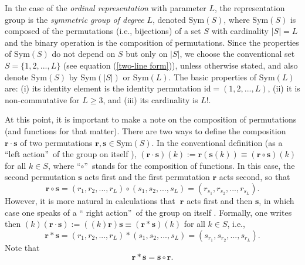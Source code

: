 \documentclass[%
 aip,
 amsmath,amssymb,
 reprint,%
]{revtex4-1}
\begin{document}
In the case of the \textit{ordinal representation} with parameter $L$, the
representation group is the \textit{symmetric group of degree} $L$, denoted $%
\mathrm{Sym}(S)$, where $\mathrm{Sym}(S)$ is composed of the permutations
(i.e., bijections) of a set $S$ with cardinality $\left\vert S\right\vert =L$
and the binary operation is the composition of permutations. Since the
properties of $\mathrm{Sym}(S)$ do not depend on $S$ but only on $\left\vert
S\right\vert $, we choose the conventional set $S=\{1,2,...,L\}$ (see
equation (\ref{two-line form})), unless otherwise stated, and also denote $%
\mathrm{Sym}(S)$ by $\mathrm{Sym}(\left\vert S\right\vert )$ or $\mathrm{Sym}%
(L)$. The basic properties of $\mathrm{Sym}(L)$ are: (i) its identity
element is the identity permutation $\mathrm{id}=(1,2,...,L)$, (ii) it is
non-commutative for $L\geq 3$, and (iii) its cardinality is $L!$.

At this point, it is important to make a note on the composition of
permutations (and functions for that matter). There are two ways to define
the composition $\mathbf{r}\cdot \mathbf{s}$ of two permutations $\mathbf{r},%
\mathbf{s}\in \mathrm{Sym}(S)$. In the conventional definition (as a
\textquotedblleft left action\textquotedblright\ of the group on itself \cite%
{Amigo2025}), $(\mathbf{r}\cdot \mathbf{s})(k):=\mathbf{r}(\mathbf{s}%
(k))\equiv (\mathbf{r}\circ \mathbf{s})(k)\mathbf{\ }$for all $k\in S$,
where \textquotedblleft $\circ $\textquotedblright\ stands for the
composition of functions. In this case, the second permutation $\mathbf{s}$
acts first and the first permutation $\mathbf{r}$ acts second, so that%
\begin{equation}
\mathbf{r}\circ \mathbf{s}=(r_{1},r_{2},...,r_{L})\circ
(s_{1},s_{2},...,s_{L})=(r_{s_{1}},r_{s_{2}},...,r_{s_{L}}).
\label{rxs left}
\end{equation}%
However, it is more natural in calculations that\textbf{\ }$\mathbf{r}$ acts
first and then $\mathbf{s}$, in which case one speaks of a \textquotedblleft
right action\textquotedblright\ of the group on itself \cite{Amigo2025}.
Formally, one writes then $(k)(\mathbf{r}\cdot \mathbf{s}):=((k)\mathbf{r})%
\mathbf{s}\equiv (\mathbf{r}\ast \mathbf{s})(k)$ for all $k\in S$, i.e.,%
\begin{equation}
\mathbf{r}\ast \mathbf{s}=(r_{1},r_{2},...,r_{L})\ast
(s_{1},s_{2},...,s_{L})=(s_{r_{1}},s_{r_{2}},...,s_{r_{L}}).
\label{rxs right}
\end{equation}%
Note that 
\begin{equation}
\mathbf{r}\ast \mathbf{s}=\mathbf{s}\circ \mathbf{r}.  \label{left right}
\end{equation}
\end{document}
